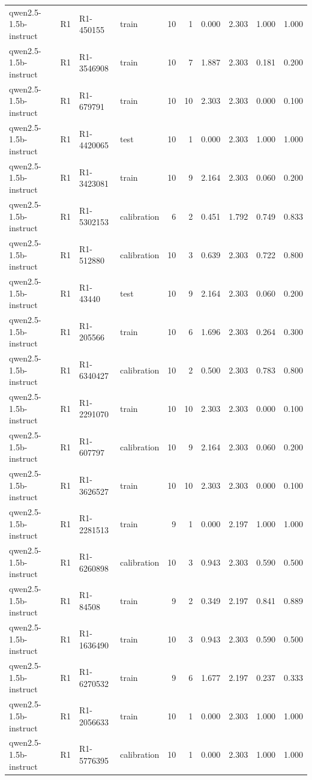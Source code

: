 \begin{table}
\begin{tabular}{llllrrrrrr}
qwen2.5-1.5b-instruct & R1 & R1-450155 & train & 10 & 1 & 0.000 & 2.303 & 1.000 & 1.000 \\
qwen2.5-1.5b-instruct & R1 & R1-3546908 & train & 10 & 7 & 1.887 & 2.303 & 0.181 & 0.200 \\
qwen2.5-1.5b-instruct & R1 & R1-679791 & train & 10 & 10 & 2.303 & 2.303 & 0.000 & 0.100 \\
qwen2.5-1.5b-instruct & R1 & R1-4420065 & test & 10 & 1 & 0.000 & 2.303 & 1.000 & 1.000 \\
qwen2.5-1.5b-instruct & R1 & R1-3423081 & train & 10 & 9 & 2.164 & 2.303 & 0.060 & 0.200 \\
qwen2.5-1.5b-instruct & R1 & R1-5302153 & calibration & 6 & 2 & 0.451 & 1.792 & 0.749 & 0.833 \\
qwen2.5-1.5b-instruct & R1 & R1-512880 & calibration & 10 & 3 & 0.639 & 2.303 & 0.722 & 0.800 \\
qwen2.5-1.5b-instruct & R1 & R1-43440 & test & 10 & 9 & 2.164 & 2.303 & 0.060 & 0.200 \\
qwen2.5-1.5b-instruct & R1 & R1-205566 & train & 10 & 6 & 1.696 & 2.303 & 0.264 & 0.300 \\
qwen2.5-1.5b-instruct & R1 & R1-6340427 & calibration & 10 & 2 & 0.500 & 2.303 & 0.783 & 0.800 \\
qwen2.5-1.5b-instruct & R1 & R1-2291070 & train & 10 & 10 & 2.303 & 2.303 & 0.000 & 0.100 \\
qwen2.5-1.5b-instruct & R1 & R1-607797 & calibration & 10 & 9 & 2.164 & 2.303 & 0.060 & 0.200 \\
qwen2.5-1.5b-instruct & R1 & R1-3626527 & train & 10 & 10 & 2.303 & 2.303 & 0.000 & 0.100 \\
qwen2.5-1.5b-instruct & R1 & R1-2281513 & train & 9 & 1 & 0.000 & 2.197 & 1.000 & 1.000 \\
qwen2.5-1.5b-instruct & R1 & R1-6260898 & calibration & 10 & 3 & 0.943 & 2.303 & 0.590 & 0.500 \\
qwen2.5-1.5b-instruct & R1 & R1-84508 & train & 9 & 2 & 0.349 & 2.197 & 0.841 & 0.889 \\
qwen2.5-1.5b-instruct & R1 & R1-1636490 & train & 10 & 3 & 0.943 & 2.303 & 0.590 & 0.500 \\
qwen2.5-1.5b-instruct & R1 & R1-6270532 & train & 9 & 6 & 1.677 & 2.197 & 0.237 & 0.333 \\
qwen2.5-1.5b-instruct & R1 & R1-2056633 & train & 10 & 1 & 0.000 & 2.303 & 1.000 & 1.000 \\
qwen2.5-1.5b-instruct & R1 & R1-5776395 & calibration & 10 & 1 & 0.000 & 2.303 & 1.000 & 1.000 \\

\end{tabular}
\end{table}
